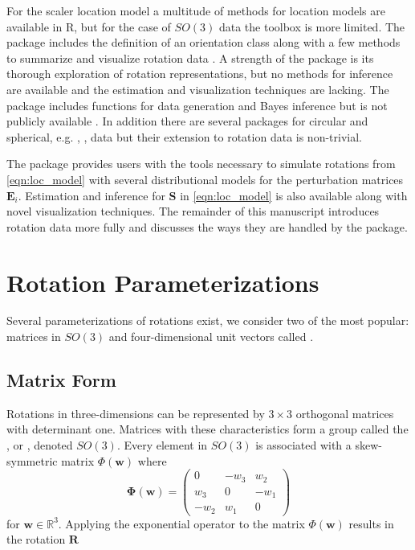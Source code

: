 For the scaler location model a multitude of methods for location models are available in R, but for the case of $SO(3)$ data the toolbox is more limited.  The  package includes the definition of an orientation class along with a few methods to summarize and visualize rotation data \citep{murdoch2003}.  A strength of the  package is its thorough exploration of rotation representations, but no methods for inference are available and the estimation and visualization techniques are lacking.  The  package includes functions for data generation and Bayes inference but is not publicly available \citet{qu2013}.  In addition there are several packages for circular and spherical, e.g. , , data but their extension to rotation data is non-trivial.

The  package provides users with the tools necessary to simulate rotations from \eqref{eqn:loc_model} with several distributional models for the perturbation matrices $\bm E_i$.  Estimation and inference for $\bm{S}$ in \eqref{eqn:loc_model} is also available along with novel visualization techniques.  The remainder of this manuscript introduces rotation data more fully and discusses the ways they are handled by the  package.


\section{Rotation Parameterizations}

Several parameterizations of rotations exist, we consider two of the most popular: matrices in $SO(3)$ and four-dimensional unit vectors called .  

\subsection{Matrix Form}

Rotations in three-dimensions can be represented by $3\times3$ orthogonal matrices with determinant one.  Matrices with these characteristics form a group called the , or , denoted $SO(3)$.  Every element in $SO(3)$ is associated with a skew-symmetric matrix $\Phi(\bm w)$ where
\[
\bm{\Phi}(\bm{w}) = \left(\begin{array}{ccc}0 & -w_3 & w_2 \\ w_3 & 0 & -w_1 \\-w_2 & w_1 & 0\end{array}\right)
\]
for $\bm w\in\mathbb{R}^3$.  Applying the exponential operator to the matrix $\Phi(\bm w)$ results in the rotation $\bm R$

